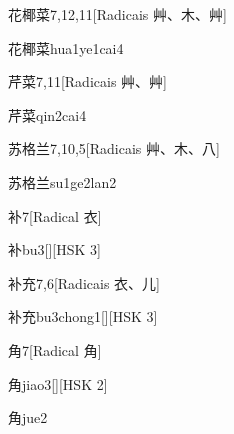 \begin{entry}{花椰菜}{7,12,11}[Radicais ⾋、⽊、⾋]
  \begin{phonetics}{花椰菜}{hua1ye1cai4}
  \end{phonetics}
\end{entry}

\begin{entry}{芹菜}{7,11}[Radicais ⾋、⾋]
  \begin{phonetics}{芹菜}{qin2cai4}
  \end{phonetics}
\end{entry}

\begin{entry}{苏格兰}{7,10,5}[Radicais ⾋、⽊、⼋]
  \begin{phonetics}{苏格兰}{su1ge2lan2}
  \end{phonetics}
\end{entry}

\begin{entry}{补}{7}[Radical ⾐]
  \begin{phonetics}{补}{bu3}[][HSK 3]
  \end{phonetics}
\end{entry}

\begin{entry}{补充}{7,6}[Radicais ⾐、⼉]
  \begin{phonetics}{补充}{bu3chong1}[][HSK 3]
  \end{phonetics}
\end{entry}

\begin{entry}{角}{7}[Radical ⾓]
  \begin{phonetics}{角}{jiao3}[][HSK 2]
  \end{phonetics}
  \begin{phonetics}{角}{jue2}
  \end{phonetics}
\end{entry}

